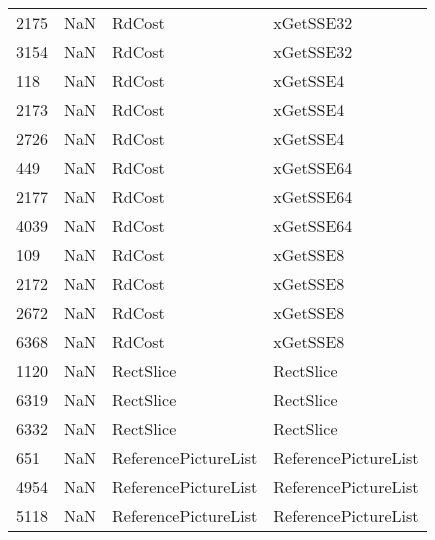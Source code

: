 \begin{tabular}{llll}
2175 &                   NaN &                     RdCost &                                 xGetSSE32 \\
3154 &                   NaN &                     RdCost &                                 xGetSSE32 \\
118  &                   NaN &                     RdCost &                                  xGetSSE4 \\
2173 &                   NaN &                     RdCost &                                  xGetSSE4 \\
2726 &                   NaN &                     RdCost &                                  xGetSSE4 \\
449  &                   NaN &                     RdCost &                                 xGetSSE64 \\
2177 &                   NaN &                     RdCost &                                 xGetSSE64 \\
4039 &                   NaN &                     RdCost &                                 xGetSSE64 \\
109  &                   NaN &                     RdCost &                                  xGetSSE8 \\
2172 &                   NaN &                     RdCost &                                  xGetSSE8 \\
2672 &                   NaN &                     RdCost &                                  xGetSSE8 \\
6368 &                   NaN &                     RdCost &                                  xGetSSE8 \\
1120 &                   NaN &                  RectSlice &                                 RectSlice \\
6319 &                   NaN &                  RectSlice &                                 RectSlice \\
6332 &                   NaN &                  RectSlice &                                 RectSlice \\
651  &                   NaN &       ReferencePictureList &                      ReferencePictureList \\
4954 &                   NaN &       ReferencePictureList &                      ReferencePictureList \\
5118 &                   NaN &       ReferencePictureList &                      ReferencePictureList \\

\end{tabular}
